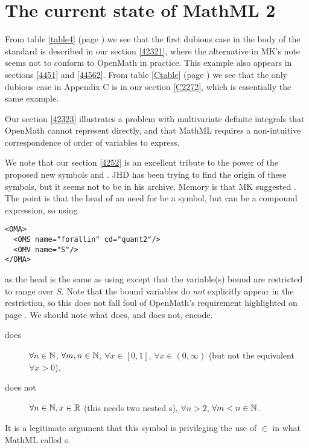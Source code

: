 \documentclass{llncs}
\begin{document}
{\section{The current state of MathML 2}
From table \ref{table4} (page \pageref{table4}) we see that the first dubious
case in the body of the standard is described in our section \ref{42321},
where the alternative in MK's note \cite{Kohlhase2008} seems not to conform to OpenMath
in practice. This example also appears in sections \ref{4451} and \ref{44562}.
From table \ref{Ctable} (page \pageref{Ctable}) we see that the only dubious
case in Appendix C is in our section \ref{C2272}, which is essentially the same
example.
\par
Our section \ref{42323} illustrates a problem with multivariate definite
integrals that OpenMath cannot represent directly, and that MathML requires a
non-intuitive correspondence of order of variables to express.
\par
We note that our section \ref{4252} is an excellent tribute to the power of the
proposed new symbols {} and {}. JHD
has been trying to find the origin of these symbols, but it seems not to be in
his archive. Memory is that MK suggested {}. The point is
that the head of an {} need for be a symbol, but can be a compound
expression, so using 
\begin{lstlisting}
<OMA>
  <OMS name="forallin" cd="quant2"/>
  <OMV name="S"/>
</OMA>
\end{lstlisting}
as the head is the same as using {}
except that the variable(s) bound are restricted to range over $S$. Note that
the bound variables do {\it not\/} explicitly appear in the restriction, so
this does not fall foul of OpenMath's requirement highlighted on page
\pageref{OMbound}.
We should note what {} does, and does not, encode.
\begin{description}
\item[does]$\forall n\in\mathbb{N}$, $\forall m,n\in\mathbb{N}$, $\forall x\in[0,1]$, $\forall
x\in(0,\infty)$ (but not the equivalent $\forall x>0$).
\item[does not]$\forall n\in\mathbb{N},x \in\mathbb{R}$ (this needs two nested
{}s), $\forall n>2$, $\forall m<n\in\mathbb{N}$.
\end{description}
It is a legitimate argument that this {} symbol is
privileging the use of $\in$ in what MathML called {}s.
\fi
\iffull
}
\end{document}
